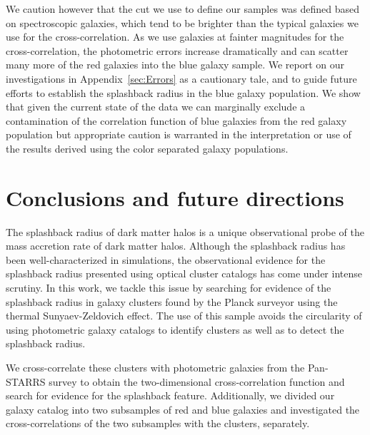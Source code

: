 \documentclass[iop, apjl, twocolappendix, numberedappendix]{emulateapj}
\begin{document}
We caution however that the cut we use to define our samples was
defined based on spectroscopic galaxies, which tend to be brighter
than the typical galaxies we use for the cross-correlation. As we use
galaxies at fainter magnitudes for the cross-correlation, the
photometric errors increase dramatically and can scatter many more of
the red galaxies into the blue galaxy sample. We report on
our investigations in Appendix~\ref{sec:Errors} as a cautionary tale,
and to guide future efforts to establish the splashback radius in the
blue galaxy population. We show that given the current state of the
data we can marginally exclude a contamination of the correlation
function of blue galaxies from the red galaxy population but
appropriate caution is warranted in the interpretation or use of the
results derived using the color separated galaxy populations.


\section{Conclusions and future directions}
\label{sec:Conclusions}
The splashback radius of dark matter halos is a unique observational
probe of the mass accretion rate of dark matter halos. Although the
splashback radius has been well-characterized in simulations, the
observational evidence for the splashback radius presented using
optical cluster catalogs has come under intense scrutiny. In this
work, we tackle this issue by searching for evidence of the
splashback radius in galaxy clusters found by the Planck surveyor using
the thermal Sunyaev-Zeldovich effect. The use of this sample avoids
the circularity of using photometric galaxy catalogs to identify
clusters as well as to detect the splashback radius. 

We cross-correlate these clusters with photometric galaxies from the
Pan-STARRS survey to obtain the two-dimensional cross-correlation
function and search for evidence for the splashback feature.
Additionally, we divided our galaxy catalog into two subsamples of
red and blue galaxies and investigated the cross-correlations of the
two subsamples with the clusters, separately.
\end{document}
